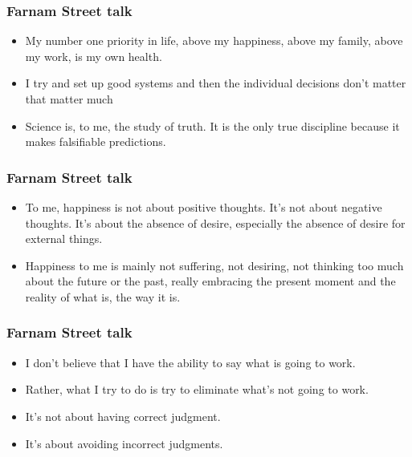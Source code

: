 \begin{frame}[fragile]\frametitle{Farnam Street talk}

\begin{itemize}
\item My number one priority in life, above my happiness, above my family, above my work, is my own health.
\item I try and set up good systems and then the individual decisions don’t matter that matter much
\item Science is, to me, the study of truth. It is the only true discipline because it makes falsifiable predictions.
\end{itemize}

\end{frame}

\begin{frame}[fragile]\frametitle{Farnam Street talk}

\begin{itemize}
\item To me, happiness is not about positive thoughts. It’s not about negative thoughts. It’s about the absence of desire, especially the absence of desire for external things.
\item Happiness to me is mainly not suffering, not desiring, not thinking too much about the future or the past, really embracing the present moment and
the reality of what is, the way it is.
\end{itemize}

\end{frame}

\begin{frame}[fragile]\frametitle{Farnam Street talk}

\begin{itemize}
\item I don’t believe that I have the ability to say what is going to work. 
\item Rather, what I try to do is try to eliminate what’s not going to work. 
\item It’s not about having correct judgment. 
\item It’s about avoiding incorrect judgments.
\end{itemize}

\end{frame}

